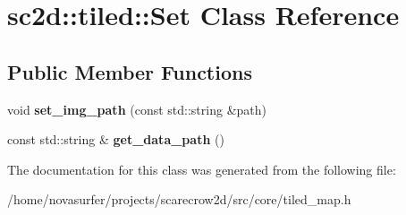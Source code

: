 \hypertarget{classsc2d_1_1tiled_1_1Set}{}\section{sc2d\+:\+:tiled\+:\+:Set Class Reference}
\label{classsc2d_1_1tiled_1_1Set}
\subsection*{Public Member Functions}
\begin{DoxyCompactItemize}
\item 
\mbox{\label{classsc2d_1_1tiled_1_1Set_a0410e35e455cb9707ef48662ef17f4d4}} 
void {\bfseries set\+\_\+img\+\_\+path} (const std\+::string \&path)
\item 
\mbox{\label{classsc2d_1_1tiled_1_1Set_adf4cb92857539132d6ab6a524f4a7e75}} 
const std\+::string \& {\bfseries get\+\_\+data\+\_\+path} ()
\end{DoxyCompactItemize}


The documentation for this class was generated from the following file\+:\begin{DoxyCompactItemize}
\item 
/home/novasurfer/projects/scarecrow2d/src/core/tiled\+\_\+map.\+h\end{DoxyCompactItemize}
